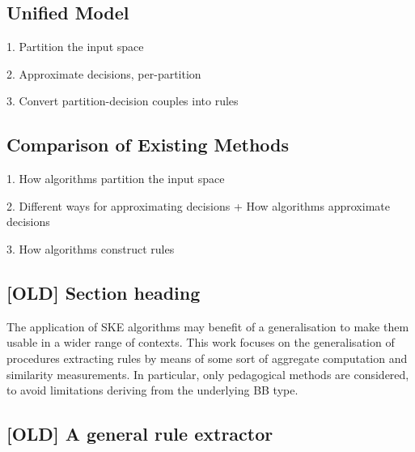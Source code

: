 \documentclass[
]{ceurart}
\begin{document}
\subsection{Unified Model}


1. Partition the input space

2. Approximate decisions, per-partition

3. Convert partition-decision couples into rules

\subsection{Comparison of Existing Methods}


1. How algorithms partition the input space

2. Different ways for approximating decisions
    + How algorithms approximate decisions

3. How algorithms construct rules

\subsection*{[OLD] Section heading}


The application of SKE algorithms may benefit of a generalisation to make them usable in a wider range of contexts.
%
This work focuses on the generalisation of procedures extracting rules by means of some sort of aggregate computation and similarity measurements.
%
In particular, only pedagogical methods are considered, to avoid limitations deriving from the underlying BB type. %
%
\subsection{[OLD] A general rule extractor}

%
%
%
\end{document}

